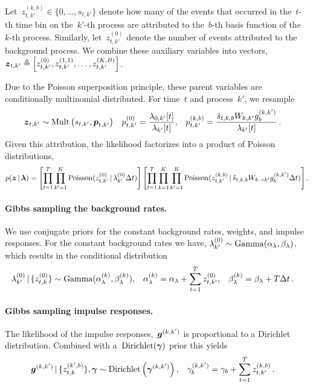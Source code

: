 Let~${z_{t,k'}^{(k,b)} \in \{0,\ldots, s_{t,k'}\}}$ denote how many of the events that occurred in the~$t$-th time bin on the~$k'$-th process are attributed to the~$b$-th basis function of the~$k$-th process.
Similarly, let~${z_{t,k'}^{(0)}}$ denote the number of events attributed to the background process. We combine these auxiliary variables into vectors,~${\boldsymbol{z}_{t,k'}\triangleq \left[z_{t,k'}^{(0)}, z_{t,k'}^{(1,1)}, \ldots, z_{t,k'}^{(K,B)} \right]}$.

Due to the Poisson superposition principle, these parent variables are conditionally multinomial distributed.
For time~$t$ and process~$k'$, we resample
\begin{align*}
\boldsymbol{z}_{t,k'} &\sim \mathrm{Mult} \left(s_{t,k'}, \boldsymbol{p}_{t,k'} \right) &
p_{t,k'}^{(0)} &= \frac{\lambda_{0,k'}[t]}{\lambda_{k'}[t]}, &
p_{t,k'}^{(k,b)} &= \frac{\hat{s}_{t,k,b} W_{k,k'} g_b^{(k,k')}}{\lambda_{k'}[t]}\, .
\end{align*}
Given this attribution, the likelihood factorizes into a product of Poisson distributions,
\begin{align*}
p(\boldsymbol{z} \,|\, \boldsymbol{\lambda}) = \left[\prod_{t=1}^T \prod_{k'=1}^K \mathrm{Poisson}(z_{t,k'}^{(0)} \,|\, \lambda_{k'}^{(0)} \Delta t)\right] 
\left[ \prod_{t=1}^T \prod_{k=1}^K \prod_{k'=1}^K  \mathrm{Poisson}(z_{t,k'}^{(k,b)} \,|\, \hat{s}_{t,k,b} W_{k \to k'} g_b^{(k,k')} \Delta t)\right].
\end{align*}

\paragraph{Gibbs sampling the background rates.}
We use conjugate priors for the constant background rates, weights, and impulse responses.
For the constant background rates we have, ${\lambda_{k'}^{(0)} \sim\mathrm{Gamma}(\alpha_\lambda, \beta_\lambda)}$, which results in the conditional distribution
\begin{align*}
\lambda_{k'}^{(0)} \,|\, \{z_{t,k}^{(0)}\} &\sim
\mathrm{Gamma}(\alpha_\lambda^{(k)}, \beta_\lambda^{(k)}), &
\alpha_\lambda^{(k)} &= \alpha_\lambda + \sum_{t=1}^T z_{t,k'}^{(0)}, &
\beta_\lambda^{(k)} &= \beta_\lambda + T \Delta t\,.
\end{align*}

\paragraph{Gibbs sampling impulse responses.}
The likelihood of the impulse responses,~$\boldsymbol{g}^{(k,k')}$ is proportional to a Dirichlet distribution. 
Combined with a~$\text{Dirichlet}(\boldsymbol{\gamma})$ prior this yields
\begin{align*}
\boldsymbol{g}^{(k,k')} &\,|\, \{z_{t,k}^{(k',b)}\}, \boldsymbol{\gamma}  \sim \text{Dirichlet}\left( \boldsymbol{\gamma}^{(k,k')} \right), &
\gamma_b^{(k,k')} &=  \gamma_b + \sum_{t=1}^T z_{t,k'}^{(k, b)}\,.
\end{align*}


